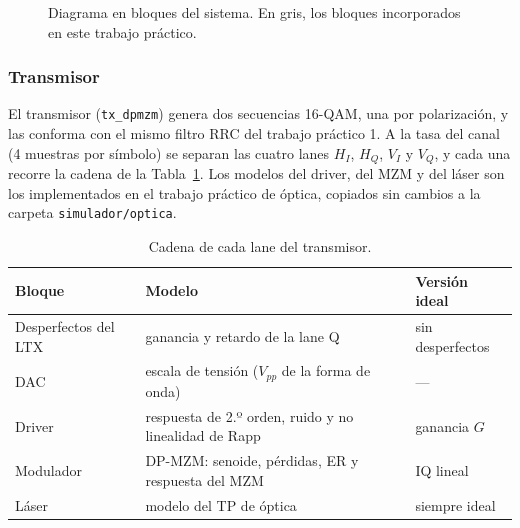 \begin{figure}[H]
\caption{Diagrama en bloques del sistema. En gris, los bloques
incorporados en este trabajo práctico.}
\label{fig:ej1_diagrama}
\end{figure}

\subsubsection*{Transmisor}

El transmisor (\texttt{tx\_dpmzm}) genera dos secuencias 16-QAM, una por
polarización, y las conforma con el mismo filtro RRC del trabajo práctico 1.
A la tasa del canal (4 muestras por símbolo) se separan las cuatro lanes
$H_I$, $H_Q$, $V_I$ y $V_Q$, y cada una recorre la cadena de la
Tabla~\ref{tab:ej1_tx}. Los modelos del driver, del MZM y del láser son
los implementados en el trabajo práctico de óptica, copiados sin cambios
a la carpeta \texttt{simulador/optica}.

\begin{table}[H]
\centering
\small
\begin{tabular}{lll}
\toprule
Bloque & Modelo & Versión ideal \\
\midrule
Desperfectos del LTX & ganancia y retardo de la lane Q & sin desperfectos \\
DAC & escala de tensión ($V_{pp}$ de la forma de onda) & --- \\
Driver & respuesta de 2.º orden, ruido y no linealidad de Rapp & ganancia $G$ \\
Modulador & DP-MZM: senoide, pérdidas, ER y respuesta del MZM & IQ lineal \\
Láser & modelo del TP de óptica & siempre ideal \\
\bottomrule
\end{tabular}
\caption{Cadena de cada lane del transmisor.}
\label{tab:ej1_tx}
\end{table}

